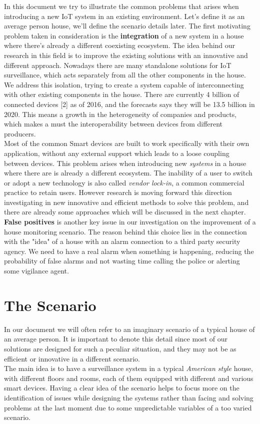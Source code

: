 In this document we try to illustrate the common problems that arises
when introducing a new IoT system in an existing environment. Let's define it as
an average person house, we'll define the scenario details later.
The first motivating problem taken in consideration is the \textbf{integration} of a new
system in a house where there's already a different coexisting ecosystem.
The idea behind our research in this field is to improve the existing solutions
with an innovative and different approach. Nowadays there are many standalone
solutions for IoT surveillance, which acts separately from all the other
components in the house. We address this isolation, trying to create
a system capable of interconnecting with other existing components in the house.
There are currently 4 billion of connected devices [2] as of 2016, and the forecasts
says they will be 13.5 billion in 2020. This means a growth in the heterogeneity of companies
and products, which makes a must the interoperability between devices from different
producers.\\
Most of the common Smart devices are built to work specifically with their own application,
without any external support which leads to a loose coupling between devices. This problem
arises when introducing new \textit{systems} in a house where there are is already a different
ecosystem. The inability of a user to switch or adopt a new technology is also called \textit{vendor lock-in},
a common commercial practice to retain users. However research is moving forward
this direction investigating in new innovative and efficient methods to solve this
problem, and there are already some approaches which will be discussed in the next chapter.
\textbf{False positives} is another key issue in our investigation on the improvement of a
house monitoring scenario. The reason behind this choice lies in the connection with the "idea"
of a house with an alarm connection to a third party security agency. We need to have a real
alarm when something is happening, reducing the probability of false alarms and not wasting time
calling the police or alerting some vigilance agent.


\section{The Scenario}

In our document we will often refer to an imaginary scenario of a typical house
of an average person. It is important to denote this detail since most of our
solutions are designed for such a peculiar situation, and they may not be as
efficient or innovative in a different scenario.\\
The main idea is to have a surveillance system in a typical \textit{American style}
house, with different floors and rooms, each of them equipped with different
and various smart devices. Having a clear idea of the scenario helps to focus more
on the identification of issues while designing the systems rather than facing
and solving problems at the last moment due to some unpredictable variables of a
too varied scenario.


